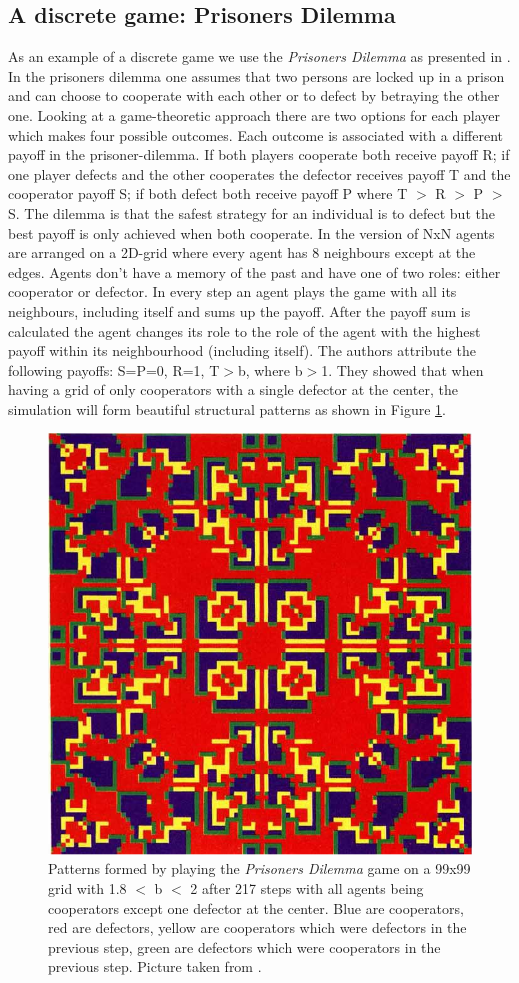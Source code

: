\subsection{A discrete game: Prisoners Dilemma}
As an example of a discrete game we use the \textit{Prisoners Dilemma} as presented in \cite{nowak_evolutionary_1992}. In the prisoners dilemma one assumes that two persons are locked up in a prison and can choose to cooperate with each other or to defect by betraying the other one. Looking at a game-theoretic approach there are two options for each player which makes four possible outcomes. Each outcome is associated with a different payoff in the prisoner-dilemma. If both players cooperate both receive payoff R; if one player defects and the other cooperates the defector receives payoff T and the cooperator payoff S; if both defect both receive payoff P where T $>$ R $>$ P $>$ S. The dilemma is that the safest strategy for an individual is to defect but the best payoff is only achieved when both cooperate. 
In the version of \cite{nowak_evolutionary_1992} NxN agents are arranged on a 2D-grid where every agent has 8 neighbours except at the edges. Agents don't have a memory of the past and have one of two roles: either cooperator or defector. In every step an agent plays the game with all its neighbours, including itself and sums up the payoff. After the payoff sum is calculated the agent changes its role to the role of the agent with the highest payoff within its neighbourhood (including itself). The authors attribute the following payoffs: S=P=0, R=1, T$>$b, where b$>$1. They showed that when having a grid of only cooperators with a single defector at the center, the simulation will form beautiful structural patterns as shown in Figure \ref{fig:sync_patterns}.

\begin{figure}
	\centering
	\includegraphics[width=.4\textwidth, angle=0]{./fig/sync_patterns.png}
	\caption{Patterns formed by playing the \textit{Prisoners Dilemma} game on a 99x99 grid with 1.8 $<$ b $<$ 2 after 217 steps with all agents being cooperators except one defector at the center. Blue are cooperators, red are defectors, yellow are cooperators which were defectors in the previous step, green are defectors which were cooperators in the previous step. Picture taken from \cite{nowak_evolutionary_1992}.}
	\label{fig:sync_patterns}
\end{figure}

